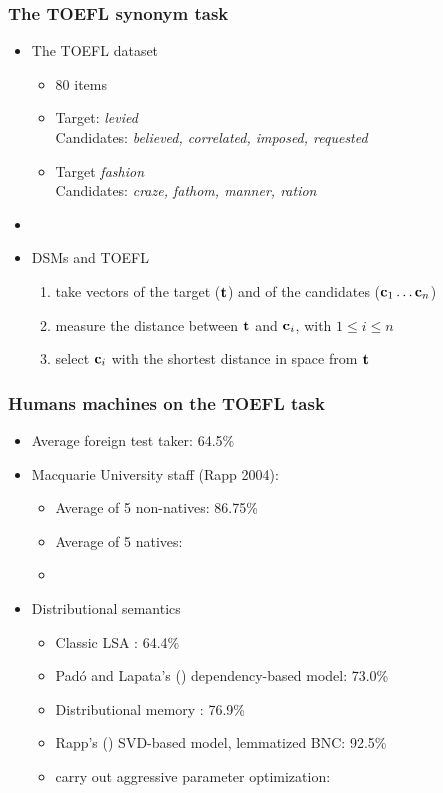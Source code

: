 \documentclass[t]{beamer} %
\begin{document}
\begin{frame}\frametitle{The TOEFL synonym task}

  \begin{itemize}
  \item The TOEFL dataset
    \begin{itemize}
    \item 80 items
    \item Target: \emph{levied}\\
      Candidates: \emph{believed, correlated, \alert<2->{imposed}, requested}
    \item<3-> Target \emph{fashion}\\
      Candidates: \emph{craze, fathom, \alert<4->{manner}, ration}
  \end{itemize}
    \item[]
  \item<5-> DSMs and TOEFL
  \begin{enumerate}
  \item take vectors of the target ($\Vector{t}$) and of the candidates
($\Vector{c}_1 \dots \Vector{c}_n$)
\item measure the distance between $\Vector{t}$ and $\Vector{c}_i$, with
$1 \leq i \leq n$ 
\item select $\Vector{c}_i$ with the shortest distance in space from $\Vector{t}$
\end{enumerate}
  \end{itemize}

\end{frame}


\begin{frame}
  \frametitle{Humans \vs machines on the TOEFL task}

  \begin{itemize}
  \item Average foreign test taker: 64.5\%
  \item<2-> Macquarie University staff (Rapp 2004):
    \begin{itemize}
    \item Average of 5 non-natives: 86.75\%
    \item Average of 5 natives: 
    \item[]
    \end{itemize}
  \item<3-> Distributional semantics
    \begin{itemize}
    \item Classic LSA \citep{Landauer:Dumais:97}: 64.4\%
    \item Padó and Lapata's (\citeyear{Pado:Lapata:07}) dependency-based model: 73.0\%
    \item Distributional memory \citep{Baroni:Lenci:10}: 76.9\%
    \item Rapp's (\citeyear{Rapp:04a}) SVD-based model, lemmatized BNC: 92.5\%
    \item \citet{Bullinaria:Levy:12} carry out aggressive parameter optimization: 
    \end{itemize}
  \end{itemize}

\end{frame}
\end{document}
